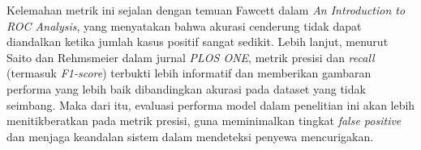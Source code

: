     Kelemahan metrik ini sejalan dengan temuan Fawcett  \cite{fawcett2006introduction} dalam \textit{An Introduction to ROC Analysis}, yang menyatakan bahwa akurasi cenderung tidak dapat diandalkan ketika jumlah kasus positif sangat sedikit. Lebih lanjut, menurut Saito dan Rehmsmeier  \cite{saito2015precision} dalam jurnal \textit{PLOS ONE}, metrik presisi dan \textit{recall} (termasuk \textit{F1-score}) terbukti lebih informatif dan memberikan gambaran performa yang lebih baik dibandingkan akurasi pada dataset yang tidak seimbang. Maka dari itu, evaluasi performa model dalam penelitian ini akan lebih menitikberatkan pada metrik presisi, guna meminimalkan tingkat \textit{false positive} dan menjaga keandalan sistem dalam mendeteksi penyewa mencurigakan.





    
    

